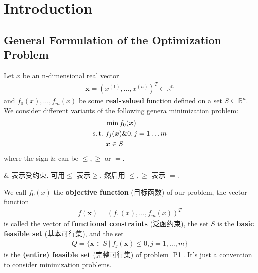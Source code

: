 \newpage
\section{Introduction}
\subsection{\small General Formulation of the Optimization Problem}

Let $x$ be an n-dimensional real vector
\begin{align*}
    \bm{x}=\left( x^{(1)}, \dots, x^{(n)} \right)^T\in \mathbb{R}^n
\end{align*}
and $f_0(x),\dots,f_m(x)$ be some \textbf{real-valued} function defined  on a set $S\subseteq \mathbb{R}^n$. We consider different variants of the following genera minimization problem:
\begin{align}
    \notag &\min f_0(\bm x)\\
    \label{P1} \st &f_j(\bm x) \& 0, j=1\dots m\\
    \notag  &\bm{x} \in S
\end{align}
where the sign $\&$ can be $\le, \ge$ or $=$. 

\& 表示受约束. 可用$\le$ 表示$\ge$, 然后用 $\le, \ge$ 表示 $=$. 

We call $f_0(x)$ the \textbf{objective function} (目标函数) of our problem, the vector function
\begin{align*}
    f(\bm x)=\left( f_1(x),\dots,f_m(x) \right)^T
\end{align*}
is called the vector of \textbf{functional constraints} (泛函约束), the set $S$ is the \textbf{basic feasible set} (基本可行集), and the set
\begin{align*}
    Q=\{ \bm x \in S\ |\ f_j(\bm x)\le 0,j=1,\dots,m \}
\end{align*}
is the \textbf{(entire) feasible set} (完整可行集) of problem \ref{P1}. It's just a convention to consider minimization problems. 

